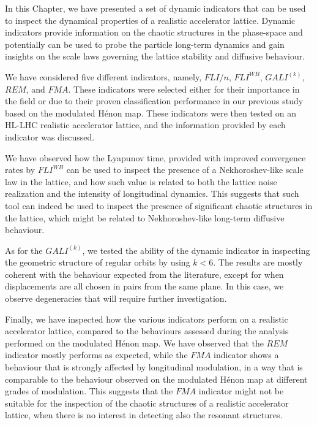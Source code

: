 In this Chapter, we have presented a set of dynamic indicators that can be used to inspect the dynamical properties of a realistic accelerator lattice. Dynamic indicators provide information on the chaotic structures in the phase-space and potentially can be used to probe the particle long-term dynamics and gain insights on the scale laws governing the lattice stability and diffusive behaviour.

We have considered five different indicators, namely, $FLI/n$, $FLI^{WB}$, $GALI^{(k)}$, $REM$, and $FMA$. These indicators were selected either for their importance in the field or due to their proven classification performance in our previous study based on the modulated Hénon map. These indicators were then tested on an HL-LHC realistic accelerator lattice, and the information provided by each indicator was discussed.

We have observed how the Lyapunov time, provided with improved convergence rates by $FLI^{WB}$ can be used to inspect the presence of a Nekhoroshev-like scale law in the lattice, and how such value is related to both the lattice noise realization and the intensity of longitudinal dynamics. This suggests that such tool can indeed be used to inspect the presence of significant chaotic structures in the lattice, which might be related to Nekhoroshev-like long-term diffusive behaviour.

As for the $GALI^{(k)}$, we tested the ability of the dynamic indicator in inspecting the geometric structure of regular orbits by using $k < 6$. The results are mostly coherent with the behaviour expected from the literature, except for when displacements are all chosen in pairs from the same plane. In this case, we observe degeneracies that will require further investigation.

Finally, we have inspected how the various indicators perform on a realistic accelerator lattice, compared to the behaviours assessed during the analysis performed on the modulated Hénon map. We have observed that the $REM$ indicator mostly performs as expected, while the $FMA$ indicator shows a behaviour that is strongly affected by longitudinal modulation, in a way that is comparable to the behaviour observed on the modulated Hénon map at different grades of modulation. This suggests that the $FMA$ indicator might not be suitable for the inspection of the chaotic structures of a realistic accelerator lattice, when there is no interest in detecting also the resonant structures.